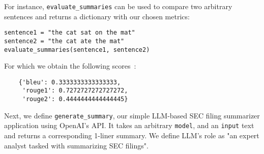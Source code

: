 For instance, \texttt{evaluate\_summaries} can be used to compare two arbitrary sentences and returns a dictionary with our chosen metrics:

\begin{verbatim}
sentence1 = "the cat sat on the mat"
sentence2 = "the cat ate the mat" 
evaluate_summaries(sentence1, sentence2)
\end{verbatim}

For which we obtain the following scores~:

\begin{verbatim}
    {'bleu': 0.3333333333333333,
     'rouge1': 0.7272727272727272,
     'rouge2': 0.4444444444444445}
\end{verbatim}

Next, we define \texttt{generate\_summary}, our simple LLM-based SEC filing summarizer application using OpenAI's API. It takes an arbitrary \texttt{model}, and an \texttt{input} text and returns a corresponding 1-liner summary. We define LLM's role as "an expert analyst tasked with summarizing SEC filings".

